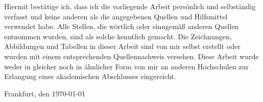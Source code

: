 %
%


Hiermit bestätige ich, dass ich die vorliegende Arbeit persönlich und selbständig verfasst und keine anderen als die angegebenen Quellen und Hilfsmittel verwendet habe. Alle Stellen, die wörtlich oder sinngemäß anderen Quellen entnommen wurden, sind als solche kenntlich gemacht. Die Zeichnungen, Abbildungen und Tabellen in dieser Arbeit sind von mir selbst erstellt oder wurden mit einem entsprechenden Quellennachweis versehen. Diese Arbeit wurde weder in gleicher noch in ähnlicher Form von mir an anderen Hochschulen zur Erlangung eines akademischen Abschlusses eingereicht.

\vspace{2cm}
Frankfurt, den \today \dotfill

\hspace{10cm} {\footnotesize \fullname}

\vspace{2cm}

